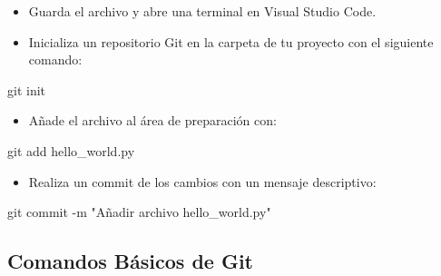 \documentclass[
  a4paper,
  DIV=11,
  numbers=noendperiod,
  onepage,
  openany]{scrreprt}
\newenvironment{Shaded}{\begin{snugshade}}{\end{snugshade}}
\newcommand{\AttributeTok}[1]{\textcolor[rgb]{0.40,0.45,0.13}{#1}}
\newcommand{\FunctionTok}[1]{\textcolor[rgb]{0.28,0.35,0.67}{#1}}
\newcommand{\NormalTok}[1]{\textcolor[rgb]{0.00,0.23,0.31}{#1}}
\newcommand{\StringTok}[1]{\textcolor[rgb]{0.13,0.47,0.30}{#1}}
\providecommand{\tightlist}{%
  \setlength{\itemsep}{0pt}\setlength{\parskip}{0pt}}\usepackage{longtable,booktabs,array}
\begin{document}
\begin{itemize}
\tightlist
\item
  Guarda el archivo y abre una terminal en Visual Studio Code.
\item
  Inicializa un repositorio Git en la carpeta de tu proyecto con el
  siguiente comando:
\end{itemize}

\begin{Shaded}
\begin{Highlighting}[]
\FunctionTok{git}\NormalTok{ init}
\end{Highlighting}
\end{Shaded}

\begin{itemize}
\tightlist
\item
  Añade el archivo al área de preparación con:
\end{itemize}

\begin{Shaded}
\begin{Highlighting}[]
\FunctionTok{git}\NormalTok{ add hello\_world.py}
\end{Highlighting}
\end{Shaded}

\begin{itemize}
\tightlist
\item
  Realiza un commit de los cambios con un mensaje descriptivo:
\end{itemize}

\begin{Shaded}
\begin{Highlighting}[]
\FunctionTok{git}\NormalTok{ commit }\AttributeTok{{-}m} \StringTok{"Añadir archivo hello\_world.py"}
\end{Highlighting}
\end{Shaded}

\subsection{Comandos Básicos de Git
📝}\label{comandos-buxe1sicos-de-git}
\end{document}
